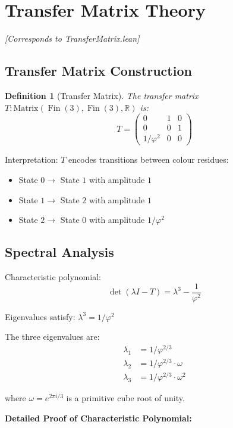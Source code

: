 \documentclass[11pt]{article}
\numberwithin{equation}{section}
\newtheorem{definition}[theorem]{Definition}
\theoremstyle{remark}
\newcommand{\R}{\mathbb{R}}
\DeclareMathOperator{\Fin}{Fin}
\begin{document}
\section{Transfer Matrix Theory}
\textit{[Corresponds to TransferMatrix.lean]}

\subsection{Transfer Matrix Construction}

\begin{definition}[Transfer Matrix]
The transfer matrix $T : \text{Matrix}(\Fin(3), \Fin(3), \R)$ is:
\[T = \begin{pmatrix}
0 & 1 & 0\\
0 & 0 & 1\\
1/\varphi^2 & 0 & 0
\end{pmatrix}\]
\end{definition}

Interpretation: $T$ encodes transitions between colour residues:
\begin{itemize}
\item State $0 \to$ State $1$ with amplitude $1$
\item State $1 \to$ State $2$ with amplitude $1$  
\item State $2 \to$ State $0$ with amplitude $1/\varphi^2$
\end{itemize}

\subsection{Spectral Analysis}

Characteristic polynomial:
\[\det(\lambda I - T) = \lambda^3 - \frac{1}{\varphi^2}\]

Eigenvalues satisfy: $\lambda^3 = 1/\varphi^2$

The three eigenvalues are:
\begin{align}
\lambda_1 &= 1/\varphi^{2/3}\\
\lambda_2 &= 1/\varphi^{2/3} \cdot \omega\\
\lambda_3 &= 1/\varphi^{2/3} \cdot \omega^2
\end{align}

where $\omega = e^{2\pi i/3}$ is a primitive cube root of unity.

\textbf{Detailed Proof of Characteristic Polynomial:}
\end{document}
